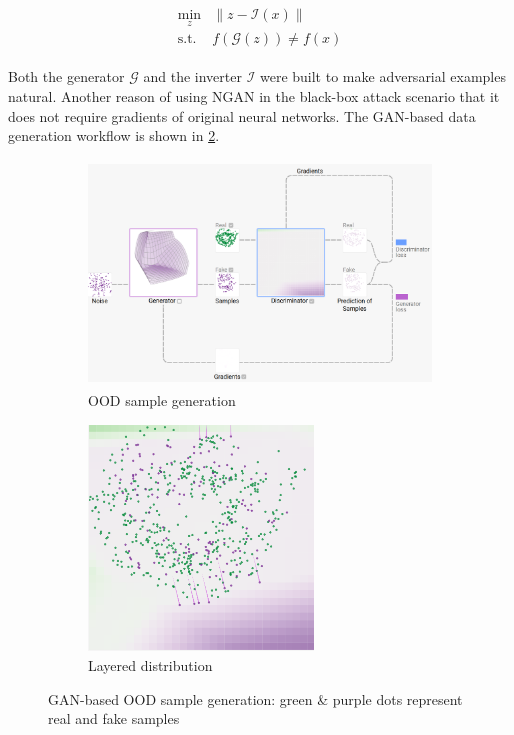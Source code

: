 \vspace{-6mm}
\begin{align}
    \begin{array}{cl}
        \min _{z} & \|z-\mathcal{I}(x)\| \\
        \text {s.t.} & f(\mathcal{G}(z)) \neq f(x)
    \end{array}
\end{align}

\hspace*{3.5mm}Both the generator $\mathcal{G}$ and the inverter $\mathcal{I}$ were built to make adversarial examples natural. Another reason of using NGAN in the black-box attack scenario that it does not require gradients of original neural networks. The GAN-based data generation workflow is shown in \cref{fig:OOD_GAN_generation}. 

\begin{figure}
	\centering
	\begin{subfigure}{.61\linewidth}
		\centering
		\includegraphics[width=\linewidth,height=60mm]{images/gan_sg.png}
		\caption{OOD sample generation}
        \label{fig:ood_sample-generation}
	\end{subfigure}
	\begin{subfigure}{0.35\linewidth}
		\centering
		\includegraphics[width=\linewidth,height=60mm]{images/ld.png}
		\caption{Layered distribution}
	\end{subfigure}
	\caption{GAN-based OOD sample generation: green \& purple dots represent real and fake samples~\cite{kahng2018gan}} 
	\label{fig:OOD_GAN_generation}
\end{figure}
\fi 

